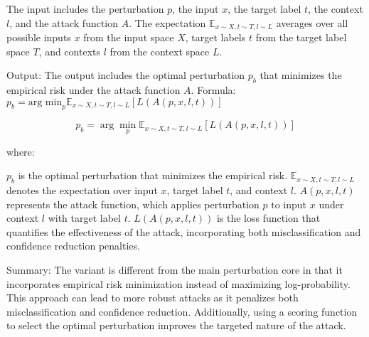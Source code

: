 The input includes the perturbation $p$, the input $x$, the target label $t$, the context $l$, and the attack function $A$. The expectation $\mathbb{E}_{x \sim X, t \sim T, l \sim L}$ averages over all possible inputs $x$ from the input space $X$, target labels $t$ from the target label space $T$, and contexts $l$ from the context space $L$.

Output: The output includes the optimal perturbation $p_b$ that minimizes the empirical risk under the attack function $A$.
Formula: $p_b = \text{arg min}_p \mathbb{E}_{x \sim X, t \sim T, l \sim L} [L(A(p, x, l, t))]$

\[
p_b = \arg \min_p \mathbb{E}_{x \sim X, t \sim T, l \sim L} \left[ L(A(p, x, l, t)) \right]
\]

where:

$p_b$ is the optimal perturbation that minimizes the empirical risk.
$\mathbb{E}_{x \sim X, t \sim T, l \sim L}$ denotes the expectation over input $x$, target label $t$, and context $l$.
$A(p, x, l, t)$ represents the attack function, which applies perturbation $p$ to input $x$ under context $l$ with target label $t$.
$L(A(p, x, l, t))$ is the loss function that quantifies the effectiveness of the attack, incorporating both misclassification and confidence reduction penalties.

Summary: The variant is different from the main perturbation core in that it incorporates empirical risk minimization instead of maximizing log-probability. This approach can lead to more robust attacks as it penalizes both misclassification and confidence reduction. Additionally, using a scoring function to select the optimal perturbation improves the targeted nature of the attack.